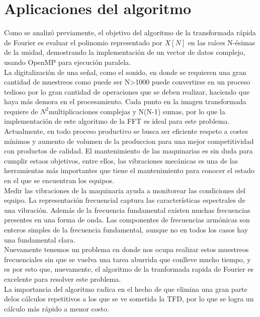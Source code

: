 \documentclass{article}
\begin{document}
\section{Aplicaciones del algoritmo}

Como se analizó previamente, el objetivo del algoritmo de la transformada rápida de Fourier es evaluar el polinomio representado por $X[N]$ en las raíces N-ésimas de la unidad, demostrando la implementación de un vector de datos complejo, usando OpenMP para ejecución paralela.\\

La digitalización de una señal, como el sonido, en donde se requieren una gran cantidad de muestreos como puede ser N>1000 puede convertirse en un proceso tedioso por lo gran cantidad de operaciones que se deben realizar, haciendo que haya más demora en el procesamiento. Cada punto en la imagen transformada requiere de $N^{2}$multiplicaciones complejas y N(N-1) sumas, por lo que la implementación de este algoritmo de la FFT es ideal para este problema.\\

Actualmente, en todo proceso productivo se busca ser eficiente respeto a costes mínimos y aumento de volumen de la produccion para una mejor competitividad con productos de calidad. El mantenimiento de las maquinarias es sin duda para cumplir estaos objetivos, entre ellos, las vibraciones mecánicas es una de las herramientas más importantes que tiene el mantenimiento para conocer el estado en el que se encuentran los equipos.\\

Medir las vibraciones de la maquinaria ayuda a monitorear las condiciones del 
equipo. La representación frecuencial captura las características espectrales de una vibración. Además de la
frecuencia fundamental existen muchas frecuencias presentes en una forma de onda. Las componentes de
frecuencias armónicas son enteros simples de la frecuencia fundamental, aunque no en todos los casos hay
una fundamental clara.\\

Nuevamente tenemos un problema en donde nos ocupa realizar estos muestreos frecuenciales sin que se vuelva una tarea aburrida que conlleve mucho tiempo, y es por esto que, nuevamente, el algoritmo de la tranformada rapida de Fourier es excelente para resolver este problema.\\

La importancia del algoritmo radica en el hecho de que elimina una gran parte delos cálculos repetitivos a los que se ve sometida la TFD, por lo que se logra un cálculo más rápido a menor costo.\\
\end{document}
